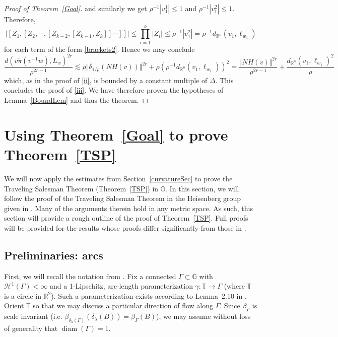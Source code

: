 \documentclass[11pt]{amsart}
\def\diam{{\rm diam\,}}
\theoremstyle{definition}
\def\diam{\operatorname{diam}}
\numberwithin{theorem}{section} \numberwithin{equation}{section}
\begin{document}
\begin{proof}[Proof of Theorem~\ref{Goal}]
and similarly we get
$\rho^{-1}|v_1^1| \leq 1$
and $\rho^{-1}|v_1^2| \leq 1$.
Therefore,
$$
|[Z_1,[Z_2,\cdots,[Z_{k-2},[Z_{k-1},Z_k]]\cdots]]| \leq \prod_{i=1}^{k} |Z_i| \leq \rho^{-1}|v_1^2| = \rho^{-1}d_{\mathbb{R}^n}(v_1,\ell_{w_1})
$$
for each term of the form \eqref{brackets2}.
Hence we may conclude
$$
\frac{d(v\tilde{\pi}(v^{-1}w),L_w)^{2r}}{\rho^{2r-1}}
\lesssim \rho \Vert \delta_{1/\rho}(NH(v)) \Vert^{2r} + \rho ( \rho^{-1}d_{\mathbb{R}^n}(v_1,\ell_{w_1}) )^{2}
= \frac{\Vert NH(v) \Vert^{2r}}{\rho^{2r-1}} + \frac{d_{\mathbb{R}^n}(v_1,\ell_{w_1})^{2}}{\rho}
$$
which, as in the proof of \eqref{ii}, is bounded by a constant multiple of $\Delta$.
This concludes the proof of \eqref{iii}. 
We have therefore proven the hypotheses of Lemma~\ref{BoundLem} and thus the theorem.
\end{proof}




\section{Using Theorem~\ref{Goal} to prove Theorem~\ref{TSP}}
\label{TSTSec}

We will now apply the estimates from Section~\ref{curvatureSec} 
to prove the Traveling Salesman Theorem (Theorem~\ref{TSP}) in $\mathbb{G}$.
In this section,
we will follow the proof of the Traveling Salesman Theorem in the Heisenberg group \cite[Theorem I]{LiSchul}
given in \cite{LiSchul}.
Many of the arguments therein hold in any metric space.
As such, this section will provide a rough outline of the proof of Theorem~\ref{TSP}.
Full proofs will be provided for the results whose proofs differ significantly from those in \cite{LiSchul}.

\subsection{Preliminaries: arcs}

First, we will recall the notation from \cite{LiSchul}.
Fix a connected $\Gamma \subset \mathbb{G}$ with $\mathcal{H}^1(\Gamma) < \infty$
and a 1-Lipschitz, arc-length parameterization $\gamma:\mathbb{T} \to \Gamma$
(where $\mathbb{T}$ is a circle in $\mathbb{R}^2$).
Such a parameterization exists according to Lemma~2.10 in \cite{LiSchul}.
Orient $\mathbb{T}$ so that we may discuss a particular direction of flow along $\Gamma$.
Since $\beta_{\Gamma}$ is scale invariant (i.e. $\beta_{\delta_{\lambda}(\Gamma)}(\delta_{\lambda}(B)) = \beta_{\Gamma}(B)$),
we may assume without loss of generality that $\diam(\Gamma) = 1$.
\end{document}
